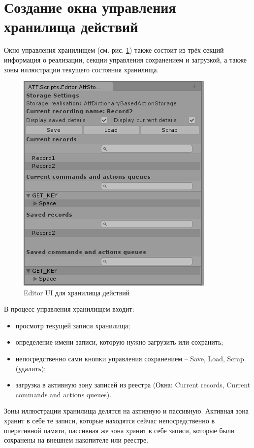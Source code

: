 \section{Создание окна управления хранилища действий}
Окно управления хранилищем (см. рис. \ref{storageUI}) также состоит из трёх секций -- информация о реализации, секции управления сохранением и загрузкой, а также зоны иллюстрации текущего состояния хранилища.

\begin{figure}[h]
	\centering
	\includegraphics[width=0.7\linewidth]{storage.PNG}
	\caption{Editor UI для хранилища действий}
	\label{storageUI}
\end{figure}

В процесс управления хранилищем входит:
\begin{itemize}
	\item
	просмотр текущей записи хранилища;
	\item
	определение имени записи, которую нужно загрузить или сохранить; 
	\item
	непосредственно сами кнопки управления сохранением -- Save, Load, Scrap (удалить);
	\item
	загрузка в активную зону записей из реестра (Окна: Current records, Current commands and actions queues).
\end{itemize}
Зоны иллюстрации хранилища делятся на активную и пассивную. Активная зона хранит в себе те записи, которые находятся сейчас непосредственно в оперативной памяти, пассивная же зона хранит в себе записи, которые были сохранены на внешнем накопителе или реестре.
